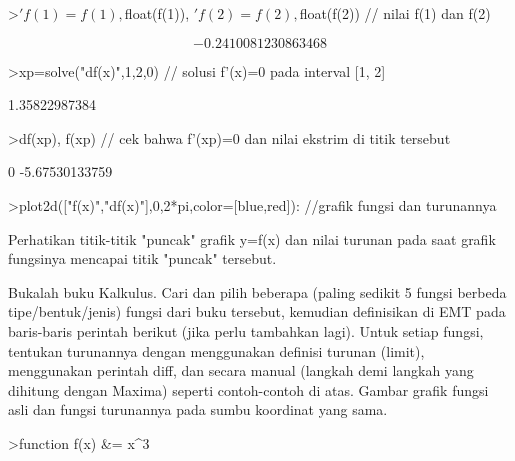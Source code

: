 \documentclass[a4paper,10pt]{article}
\begin{document}
\begin{eulernotebook}
\begin{eulercomment}
\begin{eulercomment}
\begin{eulercomment}
\begin{eulercomment}
\begin{euleroutput}
\end{euleroutput}
\begin{eulerprompt}
>$'f(1)=f(1), $float(f(1)), $'f(2)=f(2), $float(f(2)) // nilai f(1) dan f(2)
\end{eulerprompt}
\begin{eulerformula}
\[
-0.2410081230863468
\]
\end{eulerformula}
\begin{eulerprompt}
>xp=solve("df(x)",1,2,0) // solusi f'(x)=0 pada interval [1, 2]
\end{eulerprompt}
\begin{euleroutput}
  1.35822987384
\end{euleroutput}
\begin{eulerprompt}
>df(xp), f(xp) // cek bahwa f'(xp)=0 dan nilai ekstrim di titik tersebut
\end{eulerprompt}
\begin{euleroutput}
  0
  -5.67530133759
\end{euleroutput}
\begin{eulerprompt}
>plot2d(["f(x)","df(x)"],0,2*pi,color=[blue,red]): //grafik fungsi dan turunannya
\end{eulerprompt}
\begin{eulercomment}
Perhatikan titik-titik "puncak" grafik y=f(x) dan nilai turunan pada
saat grafik fungsinya mencapai titik "puncak" tersebut.
\end{eulercomment}
\begin{eulercomment}
Bukalah buku Kalkulus. Cari dan pilih beberapa (paling sedikit 5
fungsi berbeda tipe/bentuk/jenis) fungsi dari buku tersebut, kemudian
definisikan di EMT pada baris-baris perintah berikut (jika perlu
tambahkan lagi). Untuk setiap fungsi, tentukan turunannya dengan
menggunakan definisi turunan (limit), menggunakan perintah diff, dan
secara manual (langkah demi langkah yang dihitung dengan Maxima)
seperti contoh-contoh di atas. Gambar grafik fungsi asli dan fungsi
turunannya pada sumbu koordinat yang sama.
\end{eulercomment}
\begin{eulerprompt}
>function f(x) &= x^3
\end{eulerprompt}
\begin{euleroutput}
  

\end{euleroutput}
\end{eulercomment}
\end{eulercomment}
\end{eulercomment}
\end{eulercomment}
\end{eulernotebook}
\end{document}
